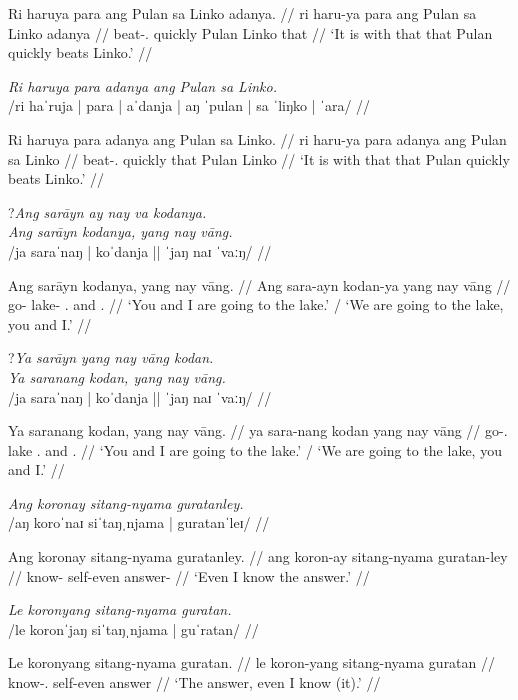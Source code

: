 \documentclass[12pt,a4paper]{scrartcl}
\newcommand{\TsgM}{{\Tsg}.{\M}}
\begin{document}
\gla Ri haruya para ang Pulan sa Linko adanya. //
\glb ri haru-ya para ang Pulan sa Linko adanya //
\glc \InsT{} beat-\TsgM{} quickly \Aarg{} Pulan \Parg{} Linko that //
\glft `It is with that that Pulan quickly beats Linko.' //
\endgl\xe

\ex\begingl
\glpreamble \textit{Ri haruya para adanya ang Pulan sa Linko.}\\
	/ri haˈruja | para | aˈdanja | aŋ ˈpulan | sa ˈliŋko | ˈara/ //

\gla Ri haruya para adanya ang Pulan sa Linko. //
\glb ri haru-ya para adanya ang Pulan sa Linko //
\glc \InsT{} beat-\TsgM{} quickly that \Aarg{} Pulan \Parg{} Linko //
\glft `It is with that that Pulan quickly beats Linko.' //
\endgl\xe

\ex\begingl
\glpreamble \judge?\textit{Ang sarāyn ay nay va kodanya.} \\
	\textit{Ang sarāyn kodanya, yang nay vāng.} \\
	/ja saraˈnaŋ | koˈdanja || ˈjaŋ naɪ ˈvaːŋ/ //

\gla Ang sarāyn kodanya,  yang nay vāng. //
\glb Ang sara-ayn kodan-ya yang nay vāng //
\glc \AgtT{} go-\Fpl{} lake-\Loc{} \Second{}.\Aarg{} and \Fsg{}.\Aarg{} //
\glft `You and I are going to the lake.' / `We are going to the lake, you and I.' //
\endgl

\ex\begingl
\glpreamble \judge?\textit{Ya sarāyn yang nay vāng kodan.} \\
	\textit{Ya saranang kodan, yang nay vāng.} \\
	/ja saraˈnaŋ | koˈdanja || ˈjaŋ naɪ ˈvaːŋ/ //

\gla Ya saranang kodan, yang nay vāng. //
\glb ya sara-nang kodan yang nay vāng //
\glc \LocT{} go-\Fpl{}.\Aarg{} lake \Second{}.\Aarg{} and \Fsg{}.\Aarg{} //
\glft `You and I are going to the lake.' / `We are going to the lake, you and I.' //
\endgl

\ex\begingl
\glpreamble \textit{Ang koronay sitang-nyama guratanley.}\\
	/aŋ koroˈnaɪ siˈtaŋˌnjama | guratanˈleɪ/ //

\gla Ang koronay sitang-nyama guratanley. //
\glb ang koron-ay sitang-nyama guratan-ley //
\glc \AgtT{} know-\Fsg{} self-even answer-\Parg{} //
\glft `Even I know the answer.' //
\endgl\xe

\ex\begingl
\glpreamble \textit{Le koronyang sitang-nyama guratan.}\\
	/le koronˈjaŋ siˈtaŋˌnjama | guˈratan/ //

\gla Le koronyang sitang-nyama guratan. //
\glb le koron-yang sitang-nyama guratan //
\glc \PatT{} know-\Fsg{}.\Aarg{} self-even answer //
\glft `The answer, even I know (it).' //
\endgl\xe
\end{document}
